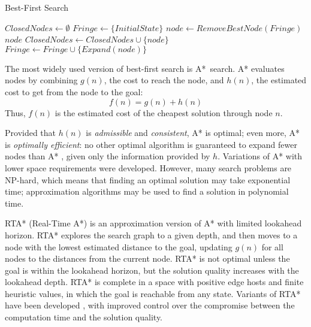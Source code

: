 \begin{algorithm}
\caption{Best-First Search}
\label{alg:bg-best-first-search}
\begin{algorithmic}[1]
\State $ClosedNodes \leftarrow \emptyset$
\State $Fringe \leftarrow \{InitialState\}$
\Loop
    \label{alg:bg-best-first-search-fringe-empty}
  \EndIf
  \State $node \leftarrow RemoveBestNode(Fringe)$
    \label{alg:bg-best-first-search-goal-reached}
    \Return $node$
  \EndIf
    \State $ClosedNodes \leftarrow ClosedNodes \cup \{node\}$ \label{alg:bg-best-first-search-remember-visited}
    \State $Fringe \leftarrow Fringe \cup \{Expand(node) \}$ \label{alg:bg-best-first-search-add-to-fringe}
  \EndIf
\EndLoop
\end{algorithmic}
\end{algorithm}

The most widely used version of best-first search is
A*~search. A* evaluates nodes by combining $g(n)$, the cost to
reach the node, and $h(n)$, the estimated cost to get from the node to the
goal:
\begin{equation}
\label{eq:a-star-heuristic}
f(n)=g(n)+h(n)
\end{equation}
Thus, $f(n)$ is the estimated cost of the cheapest solution through
node $n$.

Provided that $h(n)$ is {\em admissible} and {\em consistent}, A*
is optimal; even more, A* is {\em optimally efficient}: no
other optimal algorithm is guaranteed to expand fewer nodes than A*
\cite{Russell.aima}, given only the information provided by $h$.
Variations of A* with lower space requirements
were developed. However, many search problems are NP-hard, which
means that finding an optimal solution may take exponential time;
approximation algorithms may be used to find a solution in polynomial
time.

RTA* (Real-Time A*) \cite{Korf.rta} is an approximation version of A*
with limited lookahead horizon. RTA* explores the search graph to a
given depth, and then moves to a node with the lowest estimated
distance to the goal, updating $g(n)$ for all nodes to the distances
from the current node. RTA* is not optimal unless the goal is within
the lookahead horizon, but the solution quality increases with  the
lookahead depth. RTA* is complete in a space with positive edge hosts and
finite heuristic values, in which the goal is reachable from any state.
Variants of RTA* have been developed \cite{Russell.right},
\cite{Bulitko.dynamiccontrol}  with improved control over the
compromise between the computation time and the solution quality.

